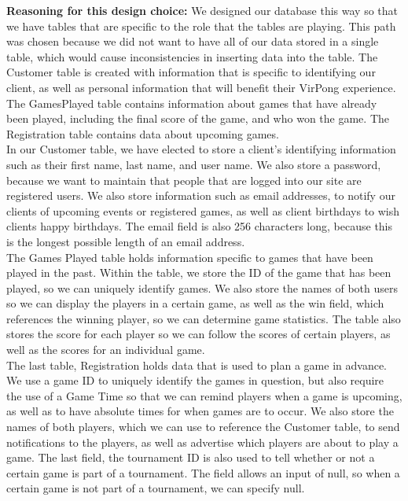 			\textbf{Reasoning for this design choice:}
				We designed our database this way so that we have tables that are specific to the role that the tables are playing. This path was chosen because we did not want to have all of our data stored in a single table, which would cause inconsistencies in inserting data into the table. The Customer table is created with information that is specific to identifying our client, as well as personal information that will benefit their VirPong experience. The GamesPlayed table contains information about games that have already been played, including the final score of the game, and who won the game. The Registration table contains data about upcoming games.\\
				In our Customer table, we have elected to store a client's identifying information such as their first name, last name, and user name. We also store a password, because we want to maintain that people that are logged into our site are registered users. We also store information such as email addresses, to notify our clients of upcoming events or registered games, as well as client birthdays to wish clients happy birthdays. The email field is also 256 characters long, because this is the longest possible length of an email address.\\
				The Games Played table holds information specific to games that have been played in the past. Within the table, we store the ID of the game that has been played, so we can uniquely identify games. We also store the names of both users so we can display the players in a certain game, as well as the win field, which references the winning player, so we can determine game statistics. The table also stores the score for each player so we can follow the scores of certain players, as well as the scores for an individual game.\\
				The last table, Registration holds data that is used to plan a game in advance. We use a game ID to uniquely identify the games in question, but also require the use of a Game Time so that we can remind players when a game is upcoming, as well as to have absolute times for when games are to occur. We also store the names of both players, which we can use to reference the Customer table, to send notifications to the players, as well as advertise which players are about to play a game. The last field, the tournament ID is also used to tell whether or not a certain game is part of a tournament. The field allows an input of null, so when a certain game is not part of a tournament, we can specify null.
